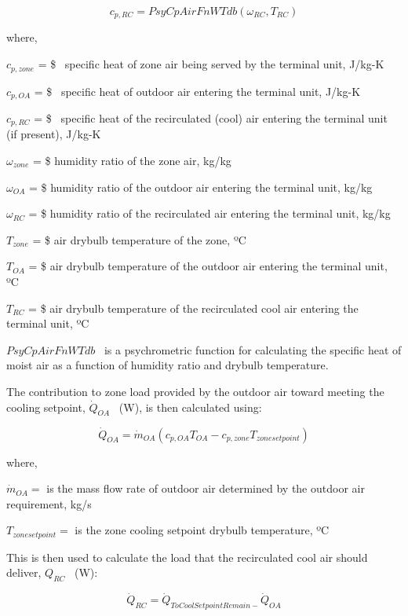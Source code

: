 \begin{equation}
{c_{p,RC}} = PsyCpAirFnWTdb\left( {{\omega_{RC}},{T_{RC}}} \right)
\end{equation}

where,

\(c_{p,zone}\) = \$ ~specific heat of zone air being served by the terminal unit, J/kg-K

\(c_{p,OA}\) = \$ ~specific heat of outdoor air entering the terminal unit, J/kg-K

\(c_{p,RC}\) = \$ ~specific heat of the recirculated (cool) air entering the terminal unit (if present), J/kg-K

\(\omega_{zone}\) = \$ humidity ratio of the zone air, kg/kg

\(\omega_{OA}\) = \$ humidity ratio of the outdoor air entering the terminal unit, kg/kg

\(\omega_{RC}\) = \$ humidity ratio of the recirculated air entering the terminal unit, kg/kg

\(T_{zone}\) = \$ air drybulb temperature of the zone, ºC

\(T_{OA}\) = \$ air drybulb temperature of the outdoor air entering the terminal unit, ºC

\(T_{RC}\) = \$ air drybulb temperature of the recirculated cool air entering the terminal unit, ºC

\(PsyCpAirFnWTdb\) ~is a psychrometric function for calculating the specific heat of moist air as a function of humidity ratio and drybulb temperature.

The contribution to zone load provided by the outdoor air toward meeting the cooling setpoint, \({\dot Q_{OA}}\) ~(W), is then calculated using:

\begin{equation}
{\dot Q_{OA}} = {\dot m_{OA}}\left( {{c_{p,OA}}{T_{OA}} - {c_{p,zone}}{T_{zonesetpoint}}} \right)
\end{equation}

where,

$\dot{m}_{OA} =$ is the mass flow rate of outdoor air determined by the outdoor air requirement, kg/s

$T_{zonesetpoint} =$ is the zone cooling setpoint drybulb temperature, ºC

This is then used to calculate the load that the recirculated cool air should deliver, \({Q_{RC}}\) ~(W):

\begin{equation}
{\dot Q_{RC}} = {\dot Q_{ToCoolSetpointRemain - }}{\dot Q_{OA}}
\end{equation}

